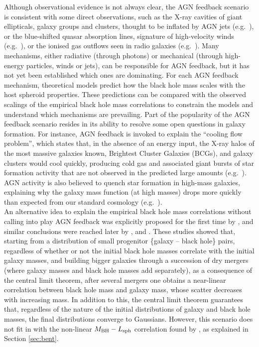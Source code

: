 Although observational evidence is not always clear, 
the AGN feedback scenario is consistent with some direct observations,
such as the X-ray cavities of giant ellipticals, galaxy groups and clusters, 
thought to be inflated by AGN jets (e.g.~\citealt{mcnamaranulsen2012}), 
or the blue-shifted quasar absorption lines, signature of high-velocity winds (e.g.~\citealt{tombesi2012}),
or the ionised gas outflows seen in radio galaxies (e.g.~\citealt{nesvadba2006}). 
Many mechanisms, either radiative (through photons) or mechanical (through high-energy
particles, winds or jets), can be responsible for AGN feedback, 
but it has not yet been established which ones are dominating. 
For each AGN feedback mechanism, 
theoretical models predict how the black hole mass scales with the host spheroid properties. 
These predictions can be compared with the observed scalings of the empirical black hole mass correlations 
to constrain the models and understand which mechanisms are prevailing. 
Part of the popularity of the AGN feedback scenario resides in its ability to resolve some 
open questions in galaxy formation.
For instance, AGN feedback is invoked to explain the ``cooling flow problem'', which states
that, in the absence of an energy input, the X-ray halos of the most massive galaxies known, Brightest
Cluster Galaxies (BCGs), and galaxy clusters
would cool quickly, producing cold gas and associated giant bursts of star formation activity that are
not observed in the predicted large amounts (e.g.~\citealt{ostrikerciotti2005}).
AGN activity is also believed to quench star formation in high-mass galaxies,
explaining why the galaxy mass function (at high masses) drops more quickly than expected from our
standard cosmology (e.g.~\citealt{croton2006}). \\

An alternative idea to explain the empirical black hole mass correlations 
without calling into play AGN feedback
was explicitly proposed for the first time by \citet{peng2007}, 
and similar conclusions were reached later by \citet{gaskell2010}, 
\citet{hirschmann2010} and \citet{jahnkemaccio2011}. 
These studies showed that, starting from a distribution of small progenitor \{galaxy -- black hole\} pairs, 
regardless of whether or not the initial black hole masses correlate with the initial galaxy masses, 
and building bigger galaxies through a succession of dry mergers 
(where galaxy masses and black hole masses add separately), 
as a consequence of the central limit theorem, 
after several mergers one obtains a near-linear correlation between black hole mass and galaxy mass, 
whose scatter decreases with increasing mass. 
In addition to this, the central limit theorem guarantees that, 
regardless of the nature of the initial distributions of galaxy and black hole masses, 
the final distributions converge to Gaussians. 
However, this scenario does not fit in with the non-linear $M_{\rm BH} - L_{\rm sph}$ correlation 
found by \cite{grahamscott2013}, 
as explained in Section \ref{sec:bent}.  \\



